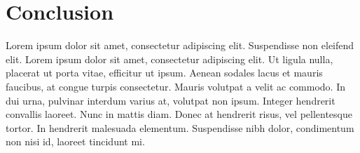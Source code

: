 \section{Conclusion} \label{sec:conclusions}
 Lorem ipsum dolor sit amet, consectetur adipiscing elit. Suspendisse non eleifend elit. Lorem ipsum dolor sit amet, consectetur adipiscing elit. Ut ligula nulla, placerat ut porta vitae, efficitur ut ipsum. Aenean sodales lacus et mauris faucibus, at congue turpis consectetur. Mauris volutpat a velit ac commodo. In dui urna, pulvinar interdum varius at, volutpat non ipsum. Integer hendrerit convallis laoreet. Nunc in mattis diam. Donec at hendrerit risus, vel pellentesque tortor. In hendrerit malesuada elementum. Suspendisse nibh dolor, condimentum non nisi id, laoreet tincidunt mi.
 

